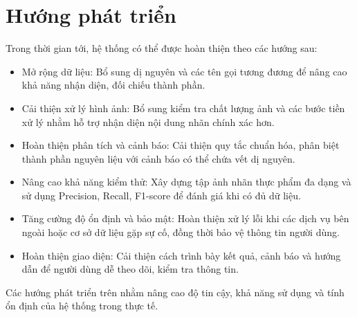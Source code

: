 \section{Hướng phát triển}

Trong thời gian tới, hệ thống có thể được hoàn thiện theo các
hướng sau:

\begin{itemize}
	\item Mở rộng dữ liệu:
	Bổ sung dị nguyên và các tên gọi tương đương để nâng cao
	khả năng nhận diện, đối chiếu thành phần.
	
	\item Cải thiện xử lý hình ảnh:
	Bổ sung kiểm tra chất lượng ảnh và các bước tiền xử lý
	nhằm hỗ trợ nhận diện nội dung nhãn chính xác hơn.
	
	\item Hoàn thiện phân tích và cảnh báo:
	Cải thiện quy tắc chuẩn hóa, phân biệt thành phần nguyên liệu
	với cảnh báo có thể chứa vết dị nguyên.
	
	\item Nâng cao khả năng kiểm thử:
	Xây dựng tập ảnh nhãn thực phẩm đa dạng và sử dụng
	Precision, Recall, F1-score để đánh giá khi có đủ dữ liệu.
	
	\item Tăng cường độ ổn định và bảo mật:
	Hoàn thiện xử lý lỗi khi các dịch vụ bên ngoài hoặc cơ sở
	dữ liệu gặp sự cố, đồng thời bảo vệ thông tin người dùng.
	
	\item Hoàn thiện giao diện:
	Cải thiện cách trình bày kết quả, cảnh báo và hướng dẫn
	để người dùng dễ theo dõi, kiểm tra thông tin.
\end{itemize}

Các hướng phát triển trên nhằm nâng cao độ tin cậy, khả năng
sử dụng và tính ổn định của hệ thống trong thực tế.